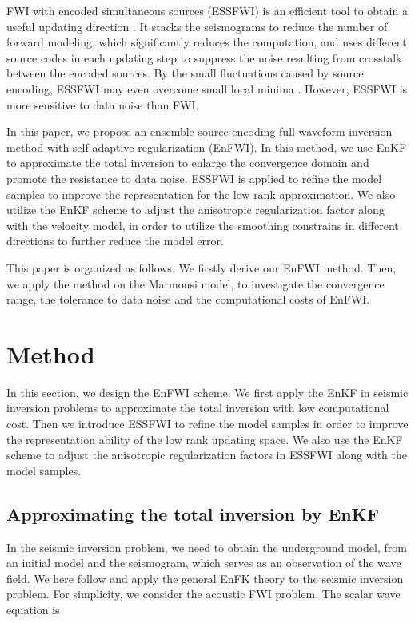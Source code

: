 \documentclass[mreferee]{gji}
\begin{document}
FWI with encoded simultaneous sources (ESSFWI) is an efficient tool to obtain a useful updating direction \cite{kr,be,ca}. It stacks the seismograms to reduce the number of forward modeling, which significantly reduces the computation, and uses different source codes in each updating step to suppress the noise resulting from crosstalk between the encoded sources. By the small fluctuations caused by source encoding, ESSFWI may even overcome small local minima \cite{ca}. However, ESSFWI is more sensitive to data noise \cite{kr} than FWI.

In this paper, we propose an ensemble source encoding full-waveform inversion method with self-adaptive regularization (EnFWI). In this method, we use EnKF to approximate the total inversion to enlarge the convergence domain and promote the resistance to data noise. ESSFWI is applied to refine the model samples to improve the representation for the low rank approximation. We also utilize the EnKF scheme to adjust the anisotropic regularization factor along with the velocity model, in order to utilize the smoothing constrains in different directions to further reduce the model error.

This paper is organized as follows. We firstly derive our EnFWI method. Then, we apply the method on the Marmousi model, to investigate the convergence range, the tolerance to data noise and the computational costs of EnFWI.


\section{Method}

In this section, we design the EnFWI scheme. We first apply the EnKF in seismic inversion problems to approximate the total inversion with low computational cost. Then we introduce ESSFWI to refine the model samples in order to improve the representation ability of the low rank updating space. We also use the EnKF scheme to adjust the anisotropic regularization factors in ESSFWI along with the model samples.

\subsection{Approximating the total inversion by EnKF}

In the seismic inversion problem, we need to obtain the underground model, from an initial model and the seismogram, which serves as an observation of the wave field. We here follow \cite{ev03} and apply the general EnFK theory to the seismic inversion problem.
For simplicity, we consider the acoustic FWI problem. The scalar wave equation is
\end{document}
